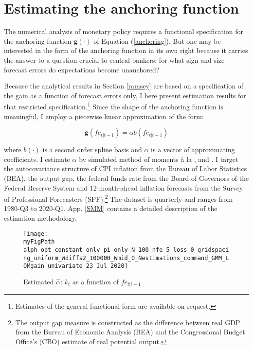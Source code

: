 \documentclass[11pt]{article}
\def \myFigPath {../../figures/}
\renewcommand{\[}{\begin{equation}}
\renewcommand{\]}{\end{equation}}
\def\mySmallFigScale{0.22}
\begin{document}
\section{Estimating the anchoring function}\label{estimation}
The numerical analysis of monetary policy requires a functional specification for the anchoring function $\mathbf{g}(\cdot)$ of Equation (\ref{anchoring}). But one may be interested in the form of the anchoring function in its own right because it carries the answer to a question crucial to central bankers: for what sign and size forecast errors do expectations become unanchored?

Because the analytical results in Section \ref{ramsey} are based on a specification of the gain as a function of forecast errors only, I here present estimation results for that restricted specification.\footnote{Estimates of the general functional form are available on request.} Since the shape of the anchoring function is meaningful, I employ a piecewise linear approximation of the form:

\begin{equation}
\mathbf{g}(fe_{t|t-1}) = \alpha b(fe_{t|t-1})\label{gain}
\end{equation}

where $b(\cdot)$ is a second order spline basis and $\alpha$ is a vector of approximating coefficients. I estimate $\alpha$ by simulated method of moments \`a la \cite{lee1991simulation}, \cite{duffie1990simulated} and \cite{smith1993SMM}. I target the autocovariance structure of CPI inflation from the Bureau of Labor Statistics (BEA), the output gap, the federal funds rate from the Board of Governors of the Federal Reserve System and 12-month-ahead inflation forecasts from the Survey of Professional Forecasters (SPF).\footnote{The output gap measure is constructed as the difference between real GDP from the Bureau of Economic Analysis (BEA) and the Congressional Budget Office's (CBO) estimate of real potential output.} The dataset is quarterly and ranges from 1980-Q3 to 2020-Q1. App. \ref{SMM} contains a detailed description of the estimation methodology.

\begin{figure}[h!]
\texttt{[image: \\myFigPath alph\_opt\_constant\_only\_pi\_only\_N\_100\_nfe\_5\_loss\_0\_gridspacing\_uniform\_Wdiffs2\_100000\_Wmid\_0\_Nestimations\_command\_GMM\_LOMgain\_univariate\_23\_Jul\_2020]}
\caption{Estimated $\hat{\alpha}$: $k_t$ as a function of $fe_{t|t-1}$}
\label{alpha_hat}
\end{figure}
\end{document}
